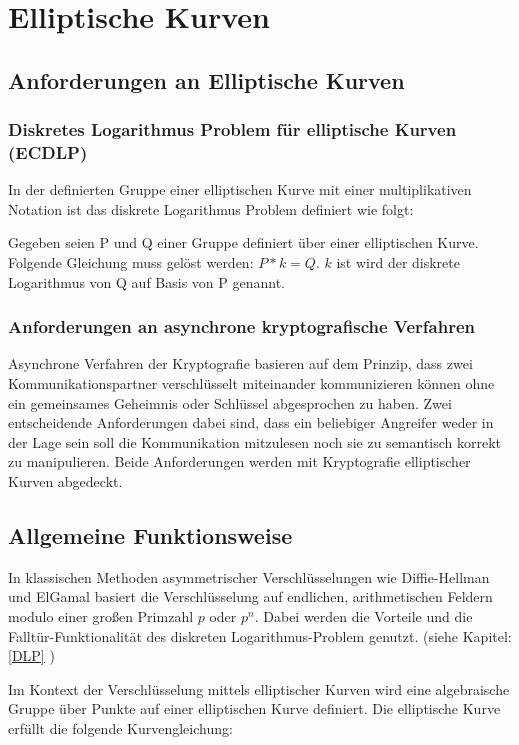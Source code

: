
\chapter{Elliptische Kurven}

\section{Anforderungen an Elliptische Kurven}


\subsection{Diskretes Logarithmus Problem für elliptische Kurven (ECDLP)}
In der definierten Gruppe einer elliptischen Kurve mit einer multiplikativen Notation
ist das diskrete Logarithmus Problem definiert wie folgt:

Gegeben seien P und Q einer Gruppe definiert über einer elliptischen Kurve.
Folgende Gleichung muss gelöst werden: $ P*k = Q $. $k$ ist wird der diskrete Logarithmus von Q
auf Basis von P genannt.

\subsection{Anforderungen an asynchrone kryptografische Verfahren}

Asynchrone Verfahren der Kryptografie basieren auf dem Prinzip, dass zwei Kommunikationspartner verschlüsselt miteinander kommunizieren können ohne ein gemeinsames Geheimnis oder Schlüssel abgesprochen zu haben. Zwei entscheidende Anforderungen dabei sind, dass ein beliebiger Angreifer weder in der Lage sein soll die Kommunikation mitzulesen noch sie zu semantisch korrekt zu manipulieren.
Beide Anforderungen werden mit Kryptografie elliptischer Kurven abgedeckt.

\section{Allgemeine Funktionsweise} \label{ECC_DLP}

In klassischen Methoden asymmetrischer Verschlüsselungen wie Diffie-Hellman und ElGamal basiert die
Verschlüsselung auf endlichen, arithmetischen Feldern modulo einer großen Primzahl $p$ oder $p^n$.
Dabei werden die Vorteile und die Falltür-Funktionalität des diskreten Logarithmus-Problem genutzt.
(siehe Kapitel: \ref{DLP} )

Im Kontext der Verschlüsselung mittels elliptischer Kurven wird eine algebraische Gruppe über Punkte
auf einer elliptischen Kurve definiert. 
Die elliptische Kurve erfüllt die folgende Kurvengleichung:

